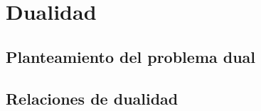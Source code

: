 \chapter{Dualidad}
\label{dual}
\section{Planteamiento del problema dual}
\section{Relaciones de dualidad}
